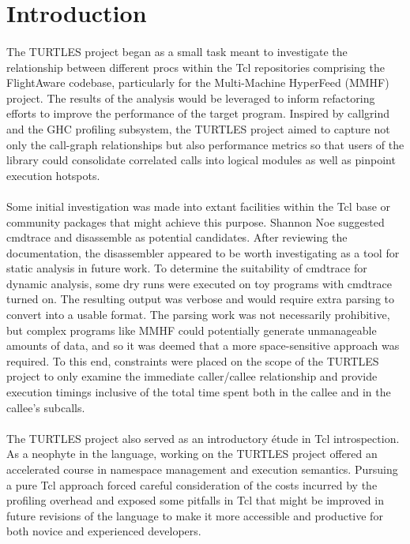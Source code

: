 \documentclass{article}[letter,10pt]
\begin{document}
\section{Introduction}{
  \paragraph{}{
    The TURTLES project began as a small task meant to investigate the
    relationship between different procs within the Tcl repositories comprising
    the FlightAware codebase, particularly for the Multi-Machine HyperFeed (MMHF)
    project. The results of the analysis would be leveraged to inform
    refactoring efforts to improve the performance of the target program.
    Inspired by callgrind\autocite{callgrind} and the GHC profiling
    subsystem\autocite{ghcprof}, the TURTLES project aimed to capture not
    only the call-graph relationships but also performance metrics so that
    users of the library could consolidate correlated calls into logical
    modules as well as pinpoint execution hotspots.
  }
  \paragraph{}{
    Some initial investigation was made into extant facilities within
    the Tcl base or community packages that might achieve this purpose.
    Shannon Noe suggested cmdtrace\autocite{tcl::cmdtrace} and
    disassemble\autocite{tcl::disassemble} as potential candidates.
    After reviewing the documentation, the disassembler appeared to
    be worth investigating as a tool for static analysis in future work.
    To determine the suitability of cmdtrace for dynamic analysis, some dry
    runs were executed on toy programs with cmdtrace turned on. The resulting
    output was verbose and would require extra parsing to convert into
    a usable format. The parsing work was not necessarily prohibitive, but
    complex programs like MMHF could potentially generate unmanageable amounts
    of data, and so it was deemed that a more space-sensitive approach was
    required.  To this end, constraints were placed on the scope of the TURTLES
    project to only examine the immediate caller/callee relationship and provide
    execution timings inclusive of the total time spent both in the callee and
    in the callee's subcalls.
  }
  \paragraph{}{
    The TURTLES project also served as an introductory étude in Tcl introspection.
    As a neophyte in the language, working on the TURTLES project offered an
    accelerated course in namespace management and execution semantics. Pursuing
    a pure Tcl approach forced careful consideration of the costs incurred by
    the profiling overhead and exposed some pitfalls in Tcl that might
    be improved in future revisions of the language to make it more accessible
    and productive for both novice and experienced developers.
  }
}
\end{document}
